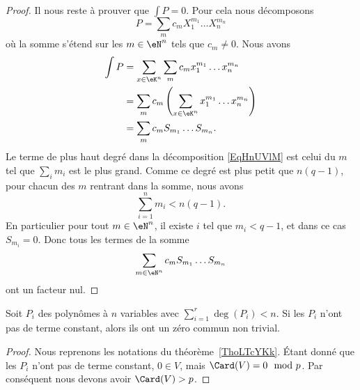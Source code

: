 \begin{proof}
	Il nous reste à prouver que \( \int P=0\). Pour cela nous décomposons
	\begin{equation}        \label{EqHnUVlM}
		P=\sum_m c_mX_1^{m_1}\ldots X_n^{m_n}
	\end{equation}
	où la somme s'étend sur les \( m\in \eN^n\) tels que \( c_m\neq 0\). Nous avons
	\begin{subequations}
		\begin{align}
			\int P & =\sum_{x\in \eK^n}\sum_mc_m x_1^{m_1}\ldots x_n^{m_n}                 \\
			       & =\sum_{m}c_m\left( \sum_{x\in \eK^n}x_1^{m_1}\ldots x_n^{m_n} \right) \\
			       & =\sum_m c_m S_{m_1}\ldots S_{m_n}.
		\end{align}
	\end{subequations}
	Le terme de plus haut degré dans la décomposition \eqref{EqHnUVlM} est celui du \( m\) tel que \( \sum_im_i\) est le plus grand. Comme ce degré est plus petit que \( n(q-1)\), pour chacun des \( m\) rentrant dans la somme, nous avons
	\begin{equation}
		\sum_{i=1}^nm_i<n(q-1).
	\end{equation}
	En particulier pour tout \( m\in \eN^n\), il existe \( i\) tel que \( m_i<q-1\), et dans ce cas \( S_{m_i}=0\). Donc tous les termes de la somme
	\begin{equation}
		\sum_{m\in \eN^n}c_mS_{m_1}\ldots S_{m_n}
	\end{equation}
	ont un facteur nul.
\end{proof}

\begin{corollary}       \label{CorfuHNKz}
	Soit \( P_i\) des polynômes à \( n\) variables avec \( \sum_{i=1}^r\deg(P_i)<n\). Si les \( P_i\) n'ont pas de terme constant, alors ils ont un zéro commun non trivial.
\end{corollary}

\begin{proof}
	Nous reprenons les notations du théorème~\ref{ThoLTcYKk}. Étant donné que les \( P_i\) n'ont pas de terme constant, \( 0\in V\), mais \( \Card(V)=0\mod p\). Par conséquent nous devons avoir \( \Card(V)>p\).
\end{proof}

